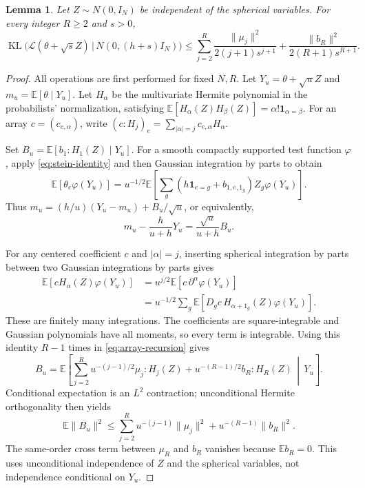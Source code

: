 \documentclass[11pt,reqno]{amsart}
\numberwithin{equation}{section}
\newtheorem{lemma}[theorem]{Lemma}
\theoremstyle{definition}
\theoremstyle{remark}
\theoremstyle{definition}
\DeclareMathOperator{\KL}{KL}
\begin{document}
\begin{lemma}\label{lem:entropy}
Let $Z\sim N(0,I_N)$ be independent of the spherical variables. For every integer $R\ge2$ and $s>0$,
\begin{equation}\label{eq:entropy-bound}
 \KL\bigl(\mathcal L(\theta+\sqrt s Z)\,|\,N(0,(h+s)I_N)\bigr)
 \le \sum_{j=2}^R\frac{\|\mu_j\|^2}{2(j+1)s^{j+1}}
       +\frac{\|b_R\|^2}{2(R+1)s^{R+1}}.
\end{equation}
\end{lemma}
\begin{proof}
All operations are first performed for fixed $N,R$.
Let $Y_u=\theta+\sqrt uZ$ and $m_u=\mathbb E[\theta\mid Y_u]$.
Let $H_\alpha$ be the multivariate Hermite polynomial in the probabilists' normalization, satisfying
$\mathbb E[H_\alpha(Z)H_\beta(Z)]=\alpha!\mathbf1_{\alpha=\beta}$.
For an array $c=(c_{e,\alpha})$, write
$(c:H_j)_e=\sum_{|\alpha|=j}c_{e,\alpha}H_\alpha$.

Set $B_u=\mathbb E[b_1:H_1(Z)\mid Y_u]$.
For a smooth compactly supported test function $\varphi$, apply \eqref{eq:stein-identity} and then Gaussian integration by parts to obtain
\[
 \mathbb E[\theta_e\varphi(Y_u)]
 =u^{-1/2}\mathbb E\left[\sum_g(h\mathbf1_{e=g}+b_{1,e,1_g})
                         Z_g\varphi(Y_u)\right].
\]
Thus $m_u=(h/u)(Y_u-m_u)+B_u/\sqrt u$, or equivalently,
\begin{equation}\label{eq:posterior}
 m_u-\frac{h}{u+h}Y_u=\frac{\sqrt u}{u+h}B_u.
\end{equation}

For any centered coefficient $c$ and $|\alpha|=j$, inserting spherical integration by parts between two Gaussian integrations by parts gives
\begin{align*}
 \mathbb E[cH_\alpha(Z)\varphi(Y_u)]
 &=u^{j/2}\mathbb E[c\,\partial^\alpha\varphi(Y_u)]\\
 &=u^{-1/2}\sum_g\mathbb E[D_gc\,H_{\alpha+1_g}(Z)\varphi(Y_u)].
\end{align*}
These are finitely many integrations. The coefficients are square-integrable and Gaussian polynomials have all moments, so every term is integrable.
Using this identity $R-1$ times in \eqref{eq:array-recursion} gives
\[
 B_u=\mathbb E\left[
       \sum_{j=2}^Ru^{-(j-1)/2}\mu_j:H_j(Z)
       +u^{-(R-1)/2}b_R:H_R(Z)\,\middle|\,Y_u\right].
\]
Conditional expectation is an $L^2$ contraction; unconditional Hermite orthogonality then yields
\begin{equation}\label{eq:B-norm}
 \mathbb E\|B_u\|^2\le
 \sum_{j=2}^Ru^{-(j-1)}\|\mu_j\|^2+u^{-(R-1)}\|b_R\|^2.
\end{equation}
The same-order cross term between $\mu_R$ and $b_R$ vanishes because $\mathbb Eb_R=0$.
This uses unconditional independence of $Z$ and the spherical variables, not independence conditional on $Y_u$.


\end{proof}
\end{document}
